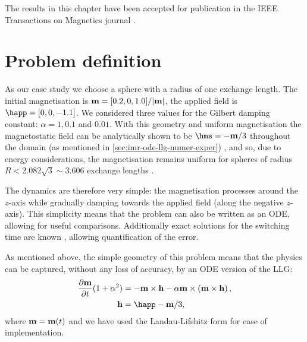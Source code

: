 The results in this chapter have been accepted for publication in the IEEE Transactions on Magnetics journal \cite{Shepherd2014}.


\section{Problem definition}

As our case study we choose a sphere with a radius of one exchange length.
The initial magnetisation is $\boldsymbol{\mathrm{m}} = [0.2, 0, 1.0]/|\boldsymbol{\mathrm{m}}|$, the applied field is $\happ =[0, 0, -1.1]$.
We considered three values for the Gilbert damping constant: $\alpha = 1, 0.1$ and $0.01$.
With this geometry and uniform magnetisation the magnetostatic field can be analytically shown to be $\hms = -\mv/3$ throughout the domain (as mentioned in \cref{sec:imr-ode-llg-numer-exper}) \cite[112]{Aharoni1996}, and so, due to energy considerations, the magnetisation remains uniform for spheres of radius $R < 2.082 \sqrt{3} \sim 3.606$ exchange lengths \cite[211]{HubertSchafer}.

The dynamics are therefore very simple: the magnetisation processes around the $z$-axis while gradually damping towards the applied field (along the negative $z$-axis).
This simplicity means that the problem can also be written as an ODE, allowing for useful comparisons.
Additionally exact solutions for the switching time are known \cite{Mallinson2000}, allowing quantification of the error.


As mentioned above, the simple geometry of this problem means that the physics can be captured, without any loss of accuracy, by an ODE version of the LLG:
\begin{equation}
  \label{eq:ode-llg}
  \begin{aligned}
    \dmdt (1 + \dampc^2) &= - \mv \times \hv - \dampc \mv \times \left( \mv \times \hv \right), \\
    \hv &= \happ - \mv/3,
  \end{aligned}
\end{equation}
where $\boldsymbol{\mathrm{m}} = \boldsymbol{\mathrm{m}}(t)$ and we have used the Landau-Lifshitz form for ease of implementation.


